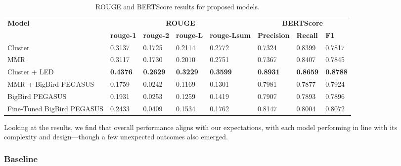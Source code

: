 \documentclass[11pt]{article}
\begin{document}
\begin{table}[]
\centering
\begin{tabular}{l|llll|lll}
\multirow{2}{*}{\textbf{Model}} & \multicolumn{4}{c|}{\textbf{ROUGE}}                                          & \multicolumn{3}{c}{\textbf{BERTScore}}             \\ \cline{2-8} 
                                & \textbf{rouge-1} & \textbf{rouge-2} & \textbf{rouge-L} & \textbf{rouge-Lsum} & \textbf{Precision} & \textbf{Recall} & \textbf{F1} \\ \hline
Cluster                         & 0.3137           & 0.1725           & 0.2114           & 0.2772              & 0.7324             & 0.8399          & 0.7817      \\
MMR                             & 0.3117           & 0.1730           & 0.2010           & 0.2751              & 0.7367             & 0.8407          & 0.7845      \\
Cluster + LED                   & \textbf{0.4376}                 & \textbf{0.2629}                 &  \textbf{0.3229}                &  \textbf{0.3599}                   &  \textbf{0.8931}                  & \textbf{0.8659 }               & \textbf{0.8788}            \\
MMR + BigBird PEGASUS                   & 0.1759           & 0.0242           & 0.1169           & 0.1301              & 0.7981             & 0.7877          & 0.7924      \\
BigBird PEGASUS                  & 0.1931                 & 0.0253                 & 0.1259                 & 0.1419                    & 0.7907                   &  0.7893               &  0.7896          \\
Fine-Tuned BigBird PEGASUS                   & 0.2433                 &  0.0409                &  0.1534                & 0.1762                    & 0.8147                   &  0.8004               &  0.8072          
\end{tabular}
\caption{ROUGE and BERTScore results for proposed models.}
\label{tab:results}
\end{table}

Looking at the results, we find that overall performance aligns with our expectations, with each model performing in line with its complexity and design—though a few unexpected outcomes also emerged.

\subsubsection{Baseline}
\end{document}
